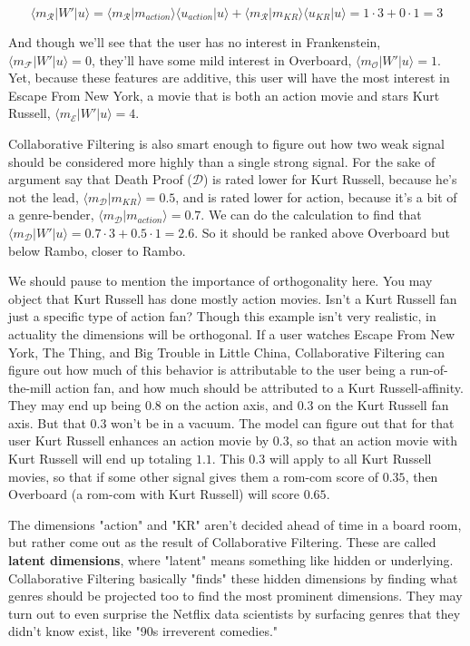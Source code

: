 \documentclass{amsbook}
\begin{document}
$$
\langle m_{\mathcal R}|W'|u\rangle = \langle m_{\mathcal R}|m_{action}\rangle\langle u_{action}|u\rangle + \langle m_{\mathcal R}|m_{KR}\rangle\langle u_{KR}|u\rangle = 1\cdot 3 + 0\cdot 1 = 3
$$

And though we'll see that the user has no interest in Frankenstein, $\langle m_{\mathcal F}|W'|u\rangle=0$, they'll have some mild interest in Overboard, $\langle m_{\mathcal O}|W'|u\rangle=1$.  Yet, because these features are additive, this user will have the most interest in Escape From New York, a movie that is both an action movie and stars Kurt Russell, $\langle m_{\mathcal E}|W'|u\rangle=4$.

Collaborative Filtering is also smart enough to figure out how two weak signal should be considered more highly than a single strong signal.  For the sake of argument say that Death Proof ($\mathcal D$) is rated lower for Kurt Russell, because he's not the lead, $\langle m_{\mathcal D}|m_{KR}\rangle = 0.5$, and is rated lower for action, because it's a bit of a genre-bender, $\langle m_{\mathcal D}|m_{action}\rangle = 0.7$.  We can do the calculation to find that $\langle m_{\mathcal D}|W'|u\rangle = 0.7\cdot 3+0.5\cdot 1 = 2.6$.  So it should be ranked above Overboard but below Rambo, closer to Rambo.

We should pause to mention the importance of orthogonality here.  You may object that Kurt Russell has done mostly action movies.  Isn't a Kurt Russell fan just a specific type of action fan?  Though this example isn't very realistic, in actuality the dimensions will be orthogonal.  If a user watches Escape From New York, The Thing, and Big Trouble in Little China, Collaborative Filtering can figure out how much of this behavior is attributable to the user being a run-of-the-mill action fan, and how much should be attributed to a Kurt Russell-affinity.  They may end up being $0.8$ on the action axis, and $0.3$ on the Kurt Russell fan axis.  But that $0.3$ won't be in a vacuum.  The model can figure out that for that user Kurt Russell enhances an action movie by $0.3$, so that an action movie with Kurt Russell will end up totaling $1.1$.  This $0.3$ will apply to all Kurt Russell movies, so that if some other signal gives them a rom-com score of $0.35$, then Overboard (a rom-com with Kurt Russell) will score $0.65$.

The dimensions "action" and "KR" aren't decided ahead of time in a board room, but rather come out as the result of Collaborative Filtering.  These are called {\bf latent dimensions}, where "latent" means something like hidden or underlying.  Collaborative Filtering basically "finds" these hidden dimensions by finding what genres should be projected too to find the most prominent dimensions.  They may turn out to even surprise the Netflix data scientists by surfacing genres that they didn't know exist, like "90s irreverent comedies."
\end{document}
